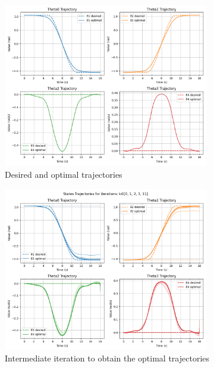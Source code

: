 \documentclass[a4paper,11pt,oneside]{book}
\begin{document}
\begin{itemize}
\begin{figure}[H]
    \centering
    \includegraphics[width=0.8\textwidth]{States_Trajectories_T1.png}
    \caption{Desired and optimal trajectories}
    \label{fig:enter-label}
\end{figure}
\begin{figure}[H]
    \centering
    \includegraphics[width=0.8\textwidth]{States_Trajectories_for_iterations_T1.png}
    \caption{Intermediate iteration to obtain the optimal trajectories}
    \label{fig:enter-label}
\end{figure}
\begin{figure}[ht]
    \begin{minipage}[t]{0.48\textwidth}
        \centering

\end{minipage}
\end{figure}
\end{itemize}
\end{document}

